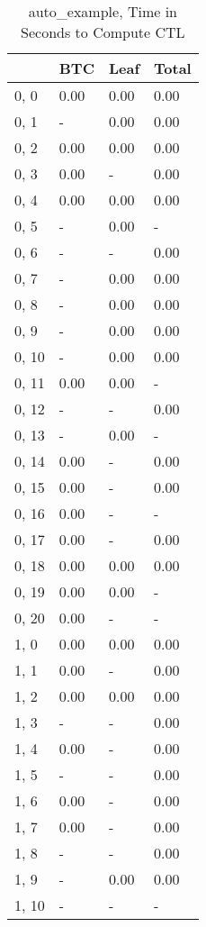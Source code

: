 \begin{table}
\centering
\caption{auto_example, Time in Seconds to Compute CTL}
\label{auto_example_CTL_time}
\begin{tabular}{llll}
\toprule
{} &   BTC &  Leaf & Total \\
\midrule
0, 0   &  0.00 &  0.00 &  0.00 \\
0, 1   &     - &  0.00 &  0.00 \\
0, 2   &  0.00 &  0.00 &  0.00 \\
0, 3   &  0.00 &     - &  0.00 \\
0, 4   &  0.00 &  0.00 &  0.00 \\
0, 5   &     - &  0.00 &     - \\
0, 6   &     - &     - &  0.00 \\
0, 7   &     - &  0.00 &  0.00 \\
0, 8   &     - &  0.00 &  0.00 \\
0, 9   &     - &  0.00 &  0.00 \\
0, 10  &     - &  0.00 &  0.00 \\
0, 11  &  0.00 &  0.00 &     - \\
0, 12  &     - &     - &  0.00 \\
0, 13  &     - &  0.00 &     - \\
0, 14  &  0.00 &     - &  0.00 \\
0, 15  &  0.00 &     - &  0.00 \\
0, 16  &  0.00 &     - &     - \\
0, 17  &  0.00 &     - &  0.00 \\
0, 18  &  0.00 &  0.00 &  0.00 \\
0, 19  &  0.00 &  0.00 &     - \\
0, 20  &  0.00 &     - &     - \\
1, 0   &  0.00 &  0.00 &  0.00 \\
1, 1   &  0.00 &     - &  0.00 \\
1, 2   &  0.00 &  0.00 &  0.00 \\
1, 3   &     - &     - &  0.00 \\
1, 4   &  0.00 &     - &  0.00 \\
1, 5   &     - &     - &  0.00 \\
1, 6   &  0.00 &     - &  0.00 \\
1, 7   &  0.00 &     - &  0.00 \\
1, 8   &     - &     - &  0.00 \\
1, 9   &     - &  0.00 &  0.00 \\
1, 10  &     - &     - &     - \\

\end{tabular}
\end{table}
